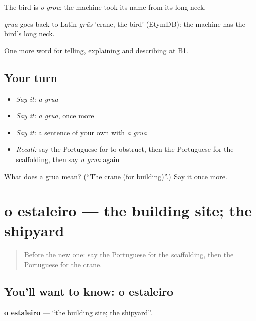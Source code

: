 The bird is \emph{o grou}; the machine took its name from its long neck.

\begin{cousinweb}
\emph{grua} goes back to Latin \emph{grūs} 'crane, the bird' (EtymDB): the machine has the bird's long neck.
\end{cousinweb}

\begin{grammarlens}[title={What you've built}]
One more word for telling, explaining and describing at B1.
\end{grammarlens}

\subsection*{Your turn}
\begin{itemize}
\raggedright
  \item \emph{Say it:} \emph{a grua}
  \item \emph{Say it:} \emph{a grua}, once more
  \item \emph{Say it:} a sentence of your own with \emph{a grua}
  \item \emph{Recall:} say the Portuguese for to obstruct, then the Portuguese for the scaffolding, then say \emph{a grua} again
\end{itemize}

\begin{tcolorbox}[breakable,colback=teal!4,colframe=teal!35!black,title={Before you move on}]
What does a grua mean? (\textquotedblleft{}The crane (for building)\textquotedblright{}.) Say it once more.
\end{tcolorbox}
\section[o estaleiro]{o estaleiro — the building site; the shipyard}

\label{lesson:PT-C445-estaleiro}



\begin{quote}
Before the new one: say the Portuguese for the scaffolding, then the Portuguese for the crane.
\end{quote}

\subsection*{You'll want to know: o estaleiro}
\textbf{o estaleiro} — \textquotedblleft{}the building site; the shipyard\textquotedblright{}.

